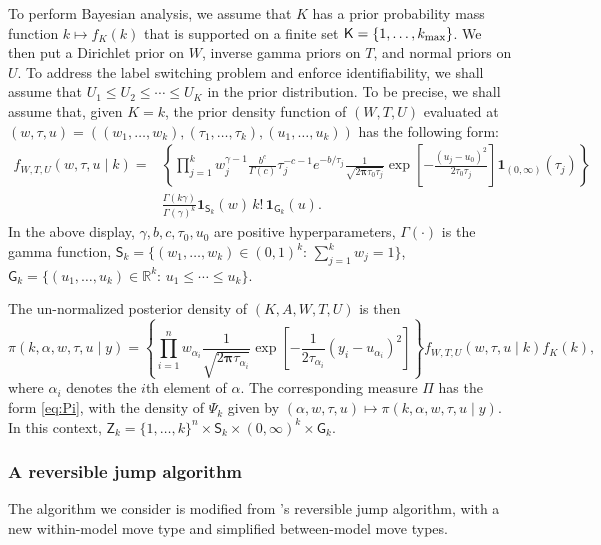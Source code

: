 \documentclass[12pt]{article}
\newcommand{\Z}{\mathsf{Z}}
\newcommand{\ind}{\mathbf{1}}
\newcommand{\pcite}[1]{\citeauthor{#1}'s \citeyearpar{#1}}
\begin{document}
To perform Bayesian analysis, we assume that $K$ has a prior probability mass function $k \mapsto f_K(k)$ that is supported on a finite set $\mathsf{K} = \{1, \dots, k_{\scriptsize\max}\}$.
We then put a Dirichlet prior on $W$, inverse gamma priors on $T$, and normal priors on $U$.
To address the label switching problem and enforce identifiability, we shall assume that $U_1 \leq U_2 \leq \cdots \leq U_K$ in the prior distribution.
To be precise, we shall assume that, given $K = k$, the prior density function of $(W,T,U)$ evaluated at $(w,\tau,u) = ((w_1, \dots, w_k), (\tau_1, \dots, \tau_k), (u_1, \dots, u_k))$ has the following form:
\begin{equation} \label{eq:fWTU}
	\begin{aligned}
		f_{W,T,U}(w,\tau, u \mid k) =& \left\{ \prod_{j=1}^k w_j^{\gamma - 1} \frac{b^c}{\Gamma(c)} \tau_j^{-c - 1} e^{-b/\tau_j} \frac{1}{\sqrt{2 \bm{\pi} \tau_0 \tau_j}} \exp\left[ - \frac{(u_j-u_0)^2}{2\tau_0 \tau_j}  \right] \ind_{(0,\infty)}(\tau_j) \right\} \\
		&  \frac{\Gamma(k\gamma)}{\Gamma(\gamma)^k} \ind_{\mathsf{S}_k}(w) \, k! \, \ind_{\mathsf{G}_k}(u).
	\end{aligned}
\end{equation}
In the above display, $\gamma, b, c, \tau_0, u_0$ are positive hyperparameters, $\Gamma(\cdot)$ is the gamma function, $\mathsf{S}_k = \{(w_1, \dots, w_k) \in (0,1)^k: \, \sum_{j=1}^k w_j = 1 \}$, $\mathsf{G}_k = \{(u_1, \dots, u_k) \in \mathbb{R}^k: \, u_1 \leq \cdots \leq u_k\}$.

The un-normalized posterior density of $(K,A,W,T,U)$ is then
\[
\pi(k,\alpha,w,\tau,u \mid y) = \left\{ \prod_{i=1}^n w_{\alpha_i} \frac{1}{\sqrt{2\bm{\pi} \tau_{\alpha_i} } } \exp\left[ - \frac{1}{2 \tau_{\alpha_i}} (y_i - u_{\alpha_i})^2 \right] \right\} f_{W,T,U}(w,\tau,u \mid k) f_K(k),
\]
where $\alpha_i$ denotes the $i$th element of $\alpha$.
The corresponding measure $\Pi$ has the form \eqref{eq:Pi}, with the density of $\Psi_k$ given by $(\alpha,w,\tau,u) \mapsto \pi(k, \alpha,w,\tau,u \mid y)$.
In this context, $\Z_k = \{1,\dots,k\}^n \times \mathsf{S}_k \times (0,\infty)^k \times \mathsf{G}_k$.

\subsubsection{A reversible jump algorithm}

The algorithm we consider is modified from \pcite{richardson1997bayesian} reversible jump algorithm, with a new within-model move type and simplified between-model move types.
\end{document}
